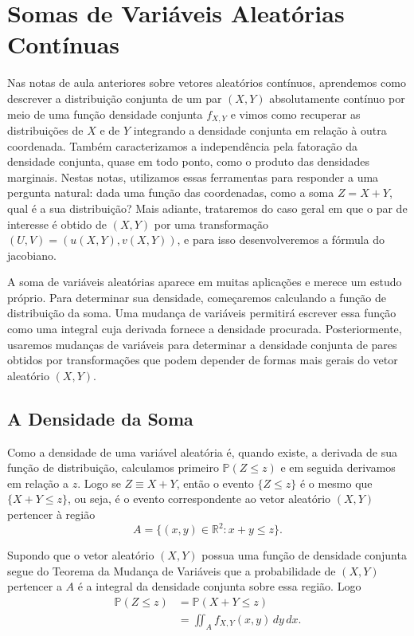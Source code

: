 \documentclass[12pt,portuguese]{article}
\theoremstyle{definition}
\theoremstyle{plainexercise}
\theoremstyle{starredexercise}
\theoremstyle{definition}
\begin{document}
\section{Somas de Variáveis Aleatórias Contínuas}\label{sec:somas-continuas}
Nas notas de aula anteriores sobre vetores aleatórios contínuos, aprendemos como
descrever a distribuição conjunta de um par $(X, Y)$ absolutamente contínuo 
por meio de uma função densidade conjunta $f_{X,Y}$ e vimos como recuperar as distribuições de $X$ e
de $Y$ integrando a densidade conjunta em relação à outra coordenada. Também
caracterizamos a independência pela fatoração da densidade conjunta, quase em
todo ponto, como o produto das densidades marginais. Nestas notas, utilizamos
essas ferramentas para responder a uma pergunta natural: dada uma função das
coordenadas, como a soma $Z = X + Y$, qual é a sua distribuição? Mais adiante,
trataremos do caso geral em que o par de interesse é obtido de $(X, Y)$ por uma
transformação $(U, V) = (u(X, Y), v(X, Y))$, e para isso desenvolveremos a
fórmula do jacobiano.

A soma de variáveis aleatórias aparece em muitas aplicações e merece um estudo próprio. 
Para determinar sua densidade, começaremos calculando a função de distribuição da soma. 
Uma mudança de variáveis permitirá escrever essa função como uma integral cuja 
derivada fornece a densidade procurada. 
Posteriormente, usaremos mudanças de variáveis para determinar a densidade 
conjunta de pares obtidos por transformações que podem depender de formas mais gerais do
vetor aleatório $(X,Y)$. 
 

\subsection{A Densidade da Soma}\label{subsec:densidade-soma}
Como a densidade de uma variável aleatória é, quando existe, a derivada de sua
função de distribuição, calculamos primeiro $\mathbb{P}(Z \leqslant z)$ e em
seguida derivamos em relação a $z$. Logo se $Z\equiv X+Y$, então o evento $\{Z \leqslant z\}$ é o mesmo que
$\{X + Y \leqslant z\}$, ou seja, é o evento correspondente ao vetor aleatório $(X, Y)$
pertencer à região
\[
  A = \{(x, y) \in \mathbb{R}^2 : x + y \leqslant z\}.
\]

Supondo que o vetor aleatório $(X,Y)$ possua uma função de densidade conjunta
segue do Teorema da Mudança de Variáveis que a probabilidade de $(X, Y)$ pertencer a $A$ é a
integral da densidade conjunta sobre essa região. Logo
\begin{align*}
  \mathbb{P}(Z \leqslant z)
  &= \mathbb{P}(X + Y \leqslant z)
  \\[0.3cm]
  &= \iint_A f_{X,Y}(x, y)\,dy\,dx.
\end{align*}
\end{document}
